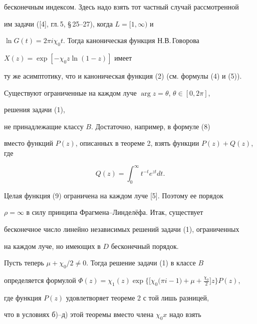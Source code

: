 бесконечным индексом. Здесь надо взять тот частный случай рассмотренной 


им задачи ([4], гл.\,5, \S\,25--27), когда $L=[1,\infty)$ и 


$\ln G(t)=2\pi i\chi_0t$. Тогда каноническая функция Н.В.\,Говорова 


$X(z)=\exp[-\chi_0z\ln(1-z)]$ имеет 


ту же асимптотику, что и каноническая функция (2) (см. формулы (4) и (5)). 


 


 


\begin{note} 


Существуют ограниченные на каждом луче $\arg z=\theta$, $\theta\in[0,2\pi]$, 


решения задачи (1), 


не принадлежащие классу $B$. Достаточно, например, в формуле (8) 


вместо функций $P(z)$, описанных в теореме 2, взять функции $P(z)+Q(z)$, где 


\begin{equation} 


Q(z)=\int^\infty_0 t^{-t}e^{zt}dt. 


\end{equation} 


Целая функция (9) ограничена на каждом луче [5]. Поэтому ее порядок 


$\rho=\infty$ в силу принципа Фрагмена--Линдел\"ефа. Итак, существует 


бесконечное число линейно независимых решений задачи (1), ограниченных 


на каждом луче, но имеющих в $D$ бесконечный порядок. 


\end{note} 


 


 


Пусть теперь $\mu+\chi_0/2\ne0$. Тогда решение задачи (1) в классе $B$ 


определяется формулой $\Phi(z)=


\chi_1(z)\exp\big\{\big[\chi_0\big(\pi i-1)+\mu+ 


\frac{\chi_0}{2}\big]z\big\}P(z)$, 


где функция $P(z)$ удовлетворяет теореме 2 с той лишь разницей, 


что в условиях б)--д) этой теоремы вместо члена $\chi_0x$ надо взять 


